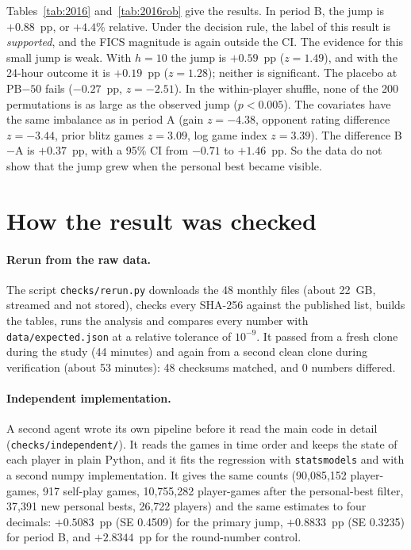 \documentclass[11pt]{article}
\begin{document}
Tables~\ref{tab:2016} and~\ref{tab:2016rob} give the results. In period B, the jump is $+0.88$~pp, or $+4.4\%$ relative. Under the decision rule, the label of this result is \emph{supported}, and the FICS magnitude is again outside the CI. The evidence for this small jump is weak. With $h=10$ the jump is $+0.59$~pp ($z=1.49$), and with the 24-hour outcome it is $+0.19$~pp ($z=1.28$); neither is significant. The placebo at PB$-50$ fails ($-0.27$~pp, $z=-2.51$). In the within-player shuffle, none of the 200 permutations is as large as the observed jump ($p<0.005$). The covariates have the same imbalance as in period A (gain $z=-4.38$, opponent rating difference $z=-3.44$, prior blitz games $z=3.09$, log game index $z=3.39$). The difference B$-$A is $+0.37$~pp, with a 95\% CI from $-0.71$ to $+1.46$~pp. So the data do not show that the jump grew when the personal best became visible.

\section{How the result was checked}\label{sec:checks}

\paragraph{Rerun from the raw data.} The script \texttt{checks/rerun.py} downloads the 48 monthly files (about 22~GB, streamed and not stored), checks every SHA-256 against the published list, builds the tables, runs the analysis and compares every number with \texttt{data/expected.json} at a relative tolerance of $10^{-9}$. It passed from a fresh clone during the study (44 minutes) and again from a second clean clone during verification (about 53 minutes): 48 checksums matched, and 0 numbers differed.

\paragraph{Independent implementation.} A second agent wrote its own pipeline before it read the main code in detail (\texttt{checks/independent/}). It reads the games in time order and keeps the state of each player in plain Python, and it fits the regression with \texttt{statsmodels} and with a second numpy implementation. It gives the same counts (90,085,152 player-games, 917 self-play games, 10,755,282 player-games after the personal-best filter, 37,391 new personal bests, 26,722 players) and the same estimates to four decimals: $+0.5083$~pp (SE 0.4509) for the primary jump, $+0.8833$~pp (SE 0.3235) for period B, and $+2.8344$~pp for the round-number control.
\end{document}
